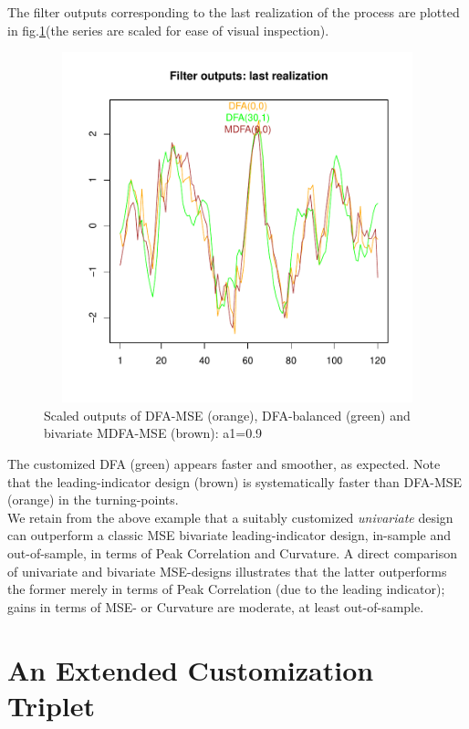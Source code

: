 \documentclass[a4paper]{book}
\begin{document}
The filter outputs corresponding to the last realization of the process are plotted in fig.\ref{z_dfa_cust_mdfa_leading_indicator}(the series are scaled for ease of visual inspection).
\begin{figure}[H]\begin{center}\includegraphics[height=4in, width=6in]{z_dfa_cust_mdfa_leading_indicator}\caption{Scaled outputs of DFA-MSE (orange), DFA-balanced (green) and bivariate MDFA-MSE (brown): a1=0.9\label{z_dfa_cust_mdfa_leading_indicator}}\end{center}\end{figure}The customized DFA (green) appears faster and smoother, as expected. Note that the leading-indicator design (brown) is systematically faster than DFA-MSE (orange) in the turning-points.  \\

We retain from the above example that a suitably customized \emph{univariate} design can outperform a classic MSE bivariate leading-indicator design, in-sample and out-of-sample, in terms of Peak Correlation and Curvature. A direct comparison of univariate and bivariate MSE-designs illustrates that the latter outperforms the former merely in terms of Peak Correlation (due to the leading indicator); gains in terms of MSE- or Curvature are moderate, at least out-of-sample.



\section{An Extended Customization Triplet}\label{customization_triplet}
\end{document}
